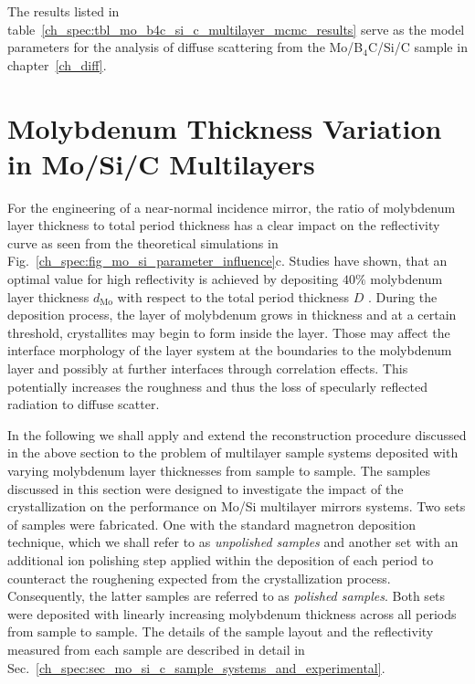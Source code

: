 The results listed in table~\ref{ch_spec:tbl_mo_b4c_si_c_multilayer_mcmc_results} serve as the model parameters for the analysis of diffuse scattering from the Mo/B$_4$C/Si/C sample in chapter~\ref{ch_diff}.

\section{Molybdenum Thickness Variation in Mo/Si/C Multilayers} \label{ch_spec:sec_mo_si_c}
For the engineering of a near-normal incidence mirror, the ratio of molybdenum layer thickness to total period thickness has a clear impact on the reflectivity curve as seen from the theoretical simulations in Fig.~\ref{ch_spec:fig_mo_si_parameter_influence}c. Studies have shown, that an optimal value for high reflectivity is achieved by depositing $40\%$ molybdenum layer thickness $d_\text{Mo}$ with respect to the total period thickness $D$ \cite{bajt_investigation_2001,braun_mo/si_2002}. During the deposition process, the layer of molybdenum grows in thickness and at a certain threshold, crystallites may begin to form \cite{verhoeven_ion_1992,bajt_investigation_2001} inside the layer. Those may affect the interface morphology of the layer system at the boundaries to the molybdenum layer and possibly at further interfaces through correlation effects. This potentially increases the roughness and thus the loss of specularly reflected radiation to diffuse scatter.

In the following we shall apply and extend the reconstruction procedure discussed in the above section to the problem of multilayer sample systems deposited with varying molybdenum layer thicknesses from sample to sample. The samples discussed in this section were designed to investigate the impact of the crystallization on the performance on Mo/Si multilayer mirrors systems. Two sets of samples were fabricated. One with the standard magnetron deposition technique, which we shall refer to as \emph{unpolished samples} and another set with an additional ion polishing step applied within the deposition of each period to counteract the roughening expected from the crystallization process. Consequently, the latter samples are referred to as \emph{polished samples}. Both sets were deposited with linearly increasing molybdenum thickness across all periods from sample to sample. The details of the sample layout and the reflectivity measured from each sample are described in detail in Sec.~\ref{ch_spec:sec_mo_si_c_sample_systems_and_experimental}. 

